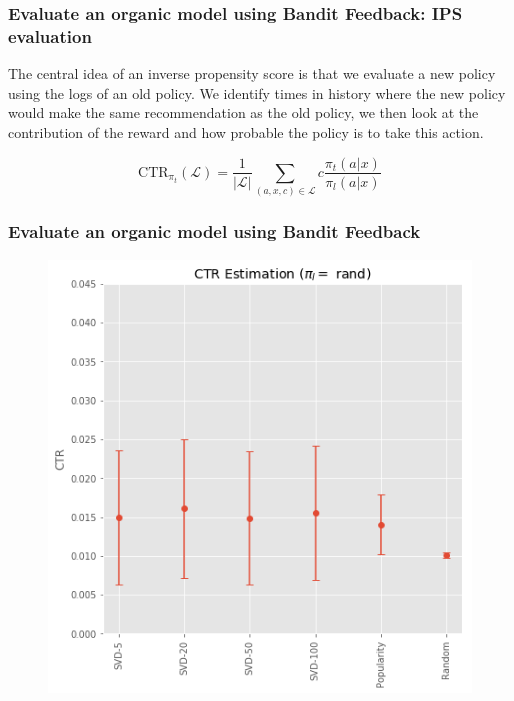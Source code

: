 \begin{frame}
  \frametitle{Evaluate an organic model using Bandit Feedback: IPS evaluation}

The central idea of an inverse propensity score is that we evaluate a new policy using the logs of an old policy.  \pause We identify times in history where the new policy would make the same recommendation as the old policy, we then look at the contribution of the reward and how probable the policy is to take this action. 

\[
\text{CTR}_{\pi_t}(\mathcal{L}) = \frac{1}{|\mathcal{L}|}\sum_{(a,x,c) \in \mathcal {L}} c \frac{\pi_t(a|x)}{\pi_l(a|x)}
\]

\end{frame}


\begin{frame}
  \frametitle{Evaluate an organic model using Bandit Feedback}
\begin{figure}[h!]
\includegraphics[scale=0.4]{images/evalorganicwithbandit3.png}
\centering
\label{motex1}
\end{figure}
\end{frame}

